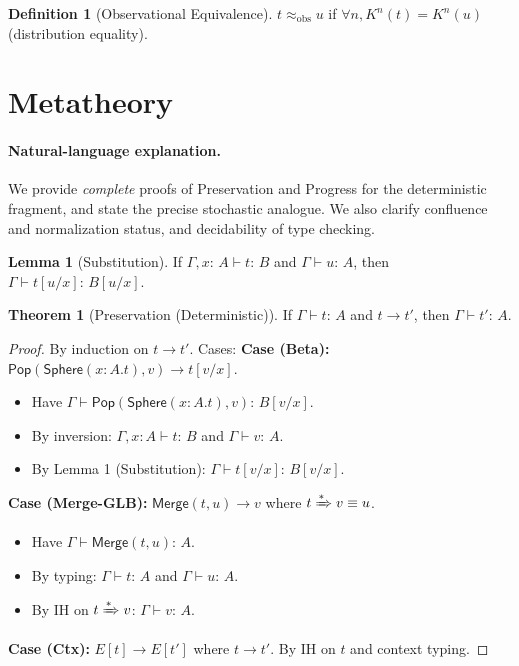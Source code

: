 \documentclass[12pt]{article}
\newcommand{\Entails}{\vdash}
\newcommand{\Types}{:\,}
\newcommand{\Subst}[2]{[#1/#2]}
\newcommand{\Sphere}{\mathsf{Sphere}}
\newcommand{\Pop}{\mathsf{Pop}}
\newcommand{\Merge}{\mathsf{Merge}}
\newcommand{\Ctx}{\Gamma}
\newcommand{\step}{\rightarrow}
\newcommand{\steps}{\xRightarrow{*}}
\theoremstyle{definition}
\newtheorem{definition}{Definition}
\newtheorem{theorem}{Theorem}
\newtheorem{lemma}{Lemma}
\begin{document}
\begin{definition}[Observational Equivalence]
$t \approx_{\text{obs}} u$ if $\forall n, K^n(t) = K^n(u)$ (distribution equality).
\end{definition}

\section{Metatheory}
\paragraph{Natural-language explanation.}
We provide \emph{complete} proofs of Preservation and Progress for the deterministic fragment, and state the precise stochastic analogue. We also clarify confluence and normalization status, and decidability of type checking.

\begin{lemma}[Substitution]
If $\Ctx,x\Types A \Entails t \Types B$ and $\Ctx \Entails u \Types A$, then $\Ctx \Entails t\Subst{u}{x} \Types B\Subst{u}{x}$.
\end{lemma}

\begin{theorem}[Preservation (Deterministic)]
If $\Ctx \Entails t \Types A$ and $t \step t'$, then $\Ctx \Entails t' \Types A$.
\end{theorem}
\begin{proof}
By induction on $t \step t'$. Cases:
\textbf{Case (Beta):} $\Pop(\Sphere(x:A.t),v) \step t[v/x]$.
\begin{itemize}
\item Have $\Ctx \Entails \Pop(\Sphere(x:A.t),v) \Types B[v/x]$.
\item By inversion: $\Ctx,x:A \Entails t \Types B$ and $\Ctx \Entails v \Types A$.
\item By Lemma 1 (Substitution): $\Ctx \Entails t[v/x] \Types B[v/x]$.
\end{itemize}
\textbf{Case (Merge-GLB):} $\Merge(t,u) \step v$ where $t \steps v \equiv u$.
\begin{itemize}
\item Have $\Ctx \Entails \Merge(t,u) \Types A$.
\item By typing: $\Ctx \Entails t \Types A$ and $\Ctx \Entails u \Types A$.
\item By IH on $t \steps v$: $\Ctx \Entails v \Types A$.
\end{itemize}
\textbf{Case (Ctx):} $E[t] \step E[t']$ where $t \step t'$.
By IH on $t$ and context typing.
\end{proof}
\end{document}
